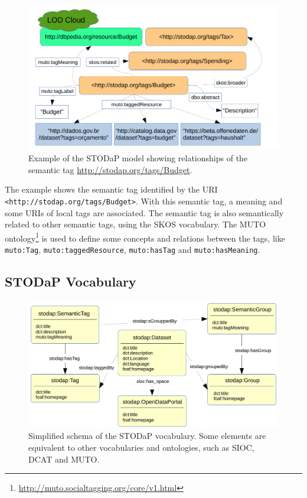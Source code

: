 \begin{figure}[tb]
\begin{center}
\includegraphics[width=\columnwidth]{images/example.pdf}
\caption[Example of the STODaP model.]{Example of the STODaP model showing relationships of the semantic tag \url{http://stodap.org/tags/Budget}.}
\label{fig:example}
\end{center}
\end{figure}

The example shows the semantic tag identified by the URI \texttt{<http://stodap.org/tags/Budget>}. 
With this semantic tag, a meaning and some URIs of local tags are associated.
The semantic tag is also semantically related to other semantic tags, using the SKOS vocabulary.
The MUTO ontology\footnote{\url{http://muto.socialtagging.org/core/v1.html}} is used to define some concepts and relations between the tags, like \texttt{muto:Tag}, \texttt{muto:taggedResource}, \texttt{muto:hasTag} and \texttt{muto:hasMeaning}.

\subsection{STODaP Vocabulary}
\label{sec:stodap_vocabulary}

\begin{figure}[b]
\begin{center}
\includegraphics[width=\columnwidth]{images/stodap_vocabulary.pdf}
\caption[Simplified schema of the STODaP vocabulary.]{Simplified schema of the STODaP vocabulary. Some elements are equivalent to other vocabularies and ontologies, such as SIOC, DCAT and MUTO.}
\label{fig:vocabulary}
\end{center}
\end{figure}

